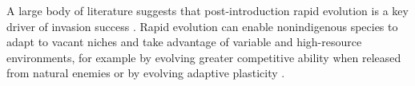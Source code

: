 \documentclass[12pt]{article}\usepackage[]{graphicx}\usepackage[]{color}
\begin{document}
	A large body of literature suggests that post-introduction rapid evolution is a key driver of invasion success  \parencite[e.g.,][]{Reznick2001, Prentis2008,Colautti2015,Lee2002invasion,Clements2011}.  Rapid evolution can enable nonindigenous species to adapt to vacant niches and take advantage of variable and high-resource environments, for example by evolving greater competitive ability  when released from natural enemies \parencite{Blossey1995,Bossdorf2005} or by evolving adaptive plasticity \parencite{Richards2006}. %
	
\end{document}
